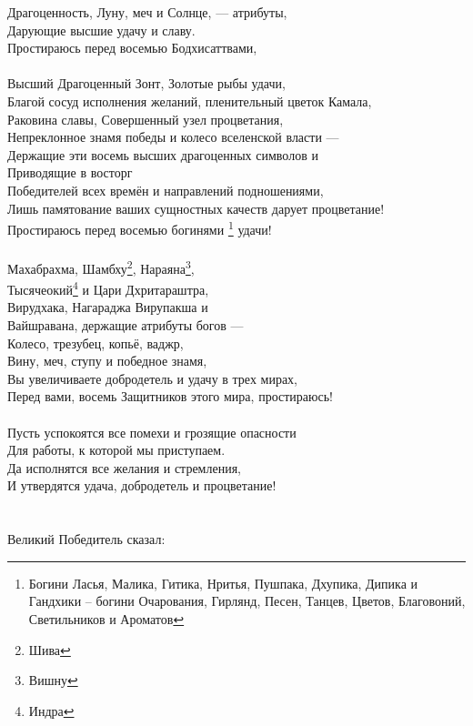 Драгоценность, Луну, меч и Солнце, — атрибуты,\\
Дарующие высшие удачу и славу.\\
Простираюсь перед восемью Бодхисаттвами, \\
\\
Высший Драгоценный Зонт, Золотые рыбы удачи,\\
Благой сосуд исполнения желаний, пленительный цветок Камала,\\
Раковина славы, Совершенный узел процветания,\\
Непреклонное знамя победы и колесо вселенской власти —\\
Держащие эти восемь высших драгоценных символов  и\\
Приводящие в восторг \\ \indent Победителей всех времён и направлений подношениями,\\
Лишь памятование ваших сущностных качеств дарует процветание!\\
Простираюсь перед восемью богинями
\footnote{ Богини Ласья, Малика, Гитика, Нритья, Пушпака, 
           Дхупика, Дипика и Гандхики – богини Очарования, 
           Гирлянд, Песен, Танцев, Цветов, Благовоний, 
           Светильников и Ароматов} удачи! \\
\\
Махабрахма, Шамбху\footnote{Шива}, Нараяна\footnote{Вишну},\\
Тысячеокий\footnote{Индра} и Цари Дхритараштра,\\
Вирудхака, Нагараджа Вирупакша и\\
Вайшравана, держащие атрибуты богов —\\
Колесо, трезубец, копьё, ваджр,\\
Вину, меч, ступу и победное знамя,\\
Вы увеличиваете добродетель и удачу в трех мирах,\\
Перед вами, восемь Защитников этого мира, простираюсь!\\
\\
\newpage
Пусть успокоятся все помехи и грозящие опасности\\
Для работы, к которой мы приступаем.\\
Да исполнятся все желания и стремления,\\
И утвердятся удача, добродетель и процветание!\\
\\
\vspace{1cm}
\\
\scriptsize
Великий Победитель сказал:
